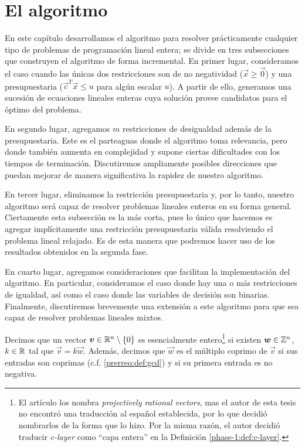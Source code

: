 \chapter{El algoritmo}


\noindent
En este capítulo desarrollamos el algoritmo para resolver prácticamente cualquier tipo de problemas
de programación lineal entera; se divide en tres subsecciones que construyen el algoritmo de forma
incremental. En primer lugar, consideramos el caso cuando las únicas dos restricciones son de no
negatividad ($\vec{x} \geq \vec{0}$) y una presupuestaria ($\vec{c}^T\vec{x} \leq u$ para algún
escalar $u$). A partir de ello, generamos una sucesión de ecuaciones lineales enteras cuya solución
provee candidatos para el óptimo del problema.

En segundo lugar, agregamos $m$ restricciones de desigualdad además de la presupuestaria. Este es el
parteaguas donde el algoritmo toma relevancia, pero donde también aumenta en complejidad y supone
ciertas dificultades con los tiempos de terminación. Discutiremos ampliamente posibles direcciones
que puedan mejorar de manera significativa la rapidez de nuestro algoritmo.

En tercer lugar, eliminamos la restricción presupuestaria y, por lo tanto, nuestro algoritmo será
capaz de resolver problemas lineales enteros en su forma general. Ciertamente esta subsección es
la más corta, pues lo único que hacemos es agregar implícitamente una restricción presupuestaria
válida resolviendo el problema lineal relajado. Es de esta manera que podremos hacer uso de los
resultados obtenidos en la segunda fase.

En cuarto lugar, agregamos consideraciones que facilitan la implementación del algoritmo. En
particular, consideramos el caso donde hay una o más restricciones de igualdad, así como el caso
donde las variables de decisión son binarias. Finalmente, discutiremos brevemente una extensión a
este algoritmo para que sea capaz de resolver problemas lineales mixtos.

\begin{definition}
	Decimos que un vector $\boldsymbol{v} \in \mathbb{R}^n \setminus \lbrace 0 \rbrace$ es esencialmente
	entero\footnote{El artículo los nombra \textit{projectively rational vectors}, mas el autor de
	esta tesis no encontró una traducción al español establecida, por lo que decidió nombrarlos de
	la forma que lo hizo. Por la misma razón, el autor decidió traducir \textit{c-layer} como ``capa
	entera'' en la Definición \ref{phase-1:def:c-layer}.} si existen $\boldsymbol{w} \in \mathbb{Z}^n$, $k \in \mathbb{R}$ tal
	que $\vec{v} = k\vec{w}$. Además, decimos que $\vec{w}$ es el múltiplo coprimo de $\vec{v}$ si sus
	entradas son coprimas (c.f. \ref{prerreq:def:gcd}) y si su primera entrada es no negativa.
\end{definition}

